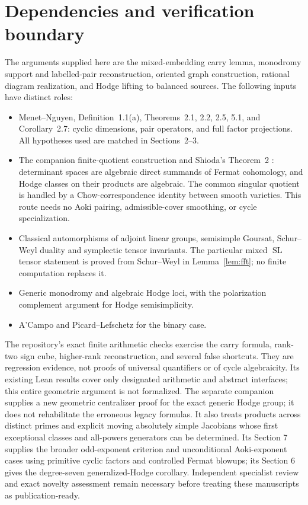 \documentclass[11pt]{article}
\theoremstyle{definition}
\newcommand{\SL}{\operatorname{SL}}
\begin{document}
\section{Dependencies and verification boundary}\label{sec:boundary}
The arguments supplied here are the mixed-embedding carry lemma,
monodromy support and labelled-pair reconstruction, oriented graph
construction, rational diagram realization, and Hodge lifting to balanced
sources. The following inputs have distinct roles:
\begin{itemize}
\item Menet--Nguyen, Definition~1.1(a), Theorems~2.1, 2.2, 2.5, 5.1,
and Corollary~2.7: cyclic dimensions, pair operators, and full factor
projections. All hypotheses used are matched in Sections~2--3.
\item The companion finite-quotient construction \cite{Fermat} and
Shioda's Theorem~2 \cite{Shioda}: determinant spaces are algebraic direct
summands of Fermat cohomology, and Hodge classes on their products are
algebraic. The common singular quotient is handled by a Chow-correspondence
identity between smooth varieties. This route needs no Aoki pairing,
admissible-cover smoothing, or cycle specialization.
\item Classical automorphisms of adjoint linear groups, semisimple Goursat,
Schur--Weyl duality and symplectic tensor invariants. The particular mixed
$\SL$ tensor statement is proved from Schur--Weyl in
Lemma~\ref{lem:fft}; no finite computation replaces it.
\item Generic monodromy and algebraic Hodge loci, with the polarization
complement argument for Hodge semisimplicity.
\item A'Campo and Picard--Lefschetz for the binary case.
\end{itemize}

The repository's exact finite arithmetic checks exercise the carry formula,
rank-two sign cube, higher-rank reconstruction, and several false shortcuts.
They are regression evidence, not proofs of universal quantifiers or of
cycle algebraicity. Its existing Lean results cover only designated
arithmetic and abstract interfaces; this entire geometric argument is not
formalized. The separate companion \cite{Extensions} supplies a new
geometric centralizer proof for the exact generic Hodge group; it does not
rehabilitate the erroneous legacy formulas. It also treats products across
distinct primes and explicit moving absolutely simple Jacobians whose first
exceptional classes and all-powers generators can be determined.
Its Section 7 supplies the broader odd-exponent criterion and unconditional
Aoki-exponent cases using primitive cyclic factors and controlled Fermat
blowups; its Section 6 gives the degree-seven generalized-Hodge corollary.
Independent specialist review and exact novelty assessment remain necessary
before treating these manuscripts as publication-ready.
\end{document}
